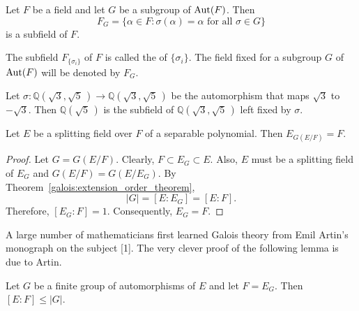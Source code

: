\begin{corollary}
Let $F$ be a field and let $G$ be a subgroup of $\operatorname{Aut}(F)$. Then 
\[
F_G\label{noteFixedG} = \{ \alpha \in F : \sigma( \alpha ) = \alpha
\mbox{ for all $\sigma \in G$} \}
\]
is a subfield of $F$.
\end{corollary}
 
 
 
 
The subfield $F_{ \{\sigma_i \} }$ of $F$ is called the  of $\{ \sigma_i \}$. The field fixed for a
subgroup $G$ of $\operatorname{Aut}(F)$ will be denoted by $F_G$. 
 

\begin{example}{}
Let $\sigma : {\mathbb Q}(\sqrt{3}, \sqrt{5}\, ) \rightarrow {\mathbb
Q}(\sqrt{3}, \sqrt{5}\, )$ be the automorphism that maps $\sqrt{3}$ to
$-\sqrt{3}$. Then ${\mathbb Q}( \sqrt{5}\, )$ is the subfield of 
${\mathbb Q}(\sqrt{3}, \sqrt{5}\, )$ left fixed by $\sigma$.
\mbox{\hspace{1in}}
\end{example}
 
 
\begin{proposition}\label{galois:fixed_field_prop}
Let $E$ be a splitting field over $F$ of a separable polynomial.
Then $E_{G(E/F)} = F$.
\end{proposition}
 
 
\begin{proof}
Let $G = G(E/F)$. Clearly, $F \subset E_G \subset E$. Also, $E$ 
must be a splitting field of $E_G$ and $G(E/F) = G(E/E_G)$. By
Theorem~\ref{galois:extension_order_theorem},
\[
|G| = [E: E_G] =[ E:F].
\]
Therefore, $[E_G : F ] =1$. Consequently,  $E_G = F$.
\end{proof}
 
 
\medskip
 
 
A large number of mathematicians first learned Galois theory from
Emil Artin's monograph on the subject [1]. The very clever proof of
the following lemma is due to Artin. 
 
 
\begin{lemma}
Let $G$ be a finite group of automorphisms of $E$ and let $F = E_G$.
Then $[E:F] \leq |G|$.
\end{lemma}
 
